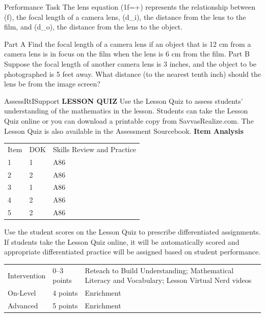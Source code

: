 \documentclass{article}
\newenvironment{practice}[2]{}{}        %
\newenvironment{te-addendum}[2]{}{}     %
\newcommand{\answer}[1]{}               %
\newcommand{\placeholder}[2]{}          %
\newcommand{\uncertain}[2]{#1}          %
\newcommand{\te}[1]{}                   %
\begin{document}
\begin{practice}{36}{3}
\te{DOK \uncertain{3}{not listed in Item Analysis and no DOK printed beside the item; provisional 3 for this Performance Task}.}
Performance Task The lens equation (\frac1f=+) represents the relationship between (f), the focal length of a camera lens, (d_i), the distance from the lens to the film, and (d_o), the distance from the lens to the object.
\placeholder{diagram}{Side cutaway of camera pointing left toward an upright green tree labeled Object. Central convex Lens and right vertical Image screen are labeled in red. Smaller inverted tree appears at image screen. Horizontal dashed optical axis passes through object, two black focal points on either side of lens, and image. Dashed rays from object top pass toward lens and converge downward at inverted image. Vertical reference lines at object, lens center, image; bottom double-headed distance arrows from object to lens labeled (d_o) and lens to image labeled (d_i). Two shorter double-headed arrows show focal distances (f) from left focal point to lens and lens to right focal point. Black upright object-height arrow and downward image-height arrow.}
Part A Find the focal length of a camera lens if an object that is 12 cm from a camera lens is in focus on the film when the lens is 6 cm from the film.
Part B Suppose the focal length of another camera lens is 3 inches, and the object to be photographed is 5 feet away. What distance (to the nearest tenth inch) should the lens be from the image screen?
\answer{PART A (f=4) cm. PART B (x\approx3.2) inches.}
\end{practice}
\begin{te-addendum}{Assess}{RtISupport}
\textbf{LESSON QUIZ}
Use the Lesson Quiz to assess students' understanding of the mathematics in the lesson.
Students can take the Lesson Quiz online or you can download a printable copy from SavvasRealize.com. The Lesson Quiz is also available in the Assessment Sourcebook.
\textbf{Item Analysis}
\begin{tabular}{lll}
Item & DOK & Skills Review and Practice \\
1 & 1 & A86 \\
2 & 2 & A86 \\
3 & 1 & A86 \\
4 & 2 & A86 \\
5 & 2 & A86 \\
\end{tabular}
Use the student scores on the Lesson Quiz to prescribe differentiated assignments.
If students take the Lesson Quiz online, it will be automatically scored and appropriate differentiated practice will be assigned based on student performance.
\begin{tabular}{lll}
Intervention & 0--3 points & Reteach to Build Understanding; Mathematical Literacy and Vocabulary; Lesson Virtual Nerd videos \\
On-Level & 4 points & Enrichment \\
Advanced & 5 points & Enrichment \\
\end{tabular}
\end{te-addendum}
\end{document}
